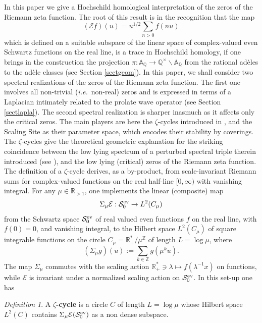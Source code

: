 \documentclass{pspum-l}
\theoremstyle{definition}
\theoremstyle{remark}
\numberwithin{equation}{section}
\newtheorem*{definition*}{Definition}
\newcommand{\ie}{{\it i.e.\/}\ }
\def\A{{\mathbb A}}
\def\Q{{\mathbb Q}}
\def\R{{\mathbb R}}
\def\Z{{\mathbb Z}}
\def\cE{{\mathcal E}}
\def\cS{{\mathcal S}}
\def\sr0{{\cS^{\rm ev}_0}}
\begin{document}
In this paper we give a Hochschild  homological interpretation of  the  zeros of the Riemann zeta function.  The root of this result is in the recognition that the map 
\[
(\cE f)(u)=u^{1/2}\sum_{n>0} f(nu)
\]
which is defined on a suitable subspace  of the linear space of complex-valued even Schwartz functions  on the real line, is a trace  in Hochschild homology, if one brings in the construction the projection $\pi:\A_\Q\to \Q^\times\backslash \A_\Q$ from the rational ad\`eles to the ad\`ele classes (see Section \ref{sectgeom}). In this paper, we shall  consider two spectral realizations of the zeros of the Riemann zeta function. The first one involves all non-trivial (\ie non-real) zeros and  is expressed in terms of a Laplacian intimately related to the prolate wave operator (see Section \ref{sectlapla}). The  second spectral realization is sharper inasmuch as it affects only the critical zeros. The main players   are here the $\zeta$-cycles introduced in \cite{ccspectral}, and  the Scaling Site \cite{CCscal1} as their parameter space, which encodes their stability  by coverings. 
 The $\zeta$-cycles give the theoretical geometric explanation for the striking  coincidence between the low lying spectrum of a perturbed spectral triple therein introduced (see \cite{ccspectral}), and the low lying (critical) zeros
of the Riemann zeta function. The definition of a $\zeta$-cycle  derives, as a by-product,  from  scale-invariant Riemann sums  for complex-valued functions  on the real half-line $[0,\infty)$  with vanishing integral. For any $\mu\in\R_{>1}$, one implements the  linear (composite) map 
\[
\Sigma_\mu \cE: \sr0\to L^2(C_\mu)
\]
from  the Schwartz space $\sr0$ of real valued even functions  $f$ on the real line, with $f(0)=0$, and vanishing  integral, to the Hilbert space $L^2(C_\mu)$ of square integrable functions on the circle $C_\mu=\R_+^*/\mu^\Z$  of length $L=\log \mu$, where 
\[
(\Sigma_\mu g)(u):=\sum_{k\in\Z} g(\mu^ku).
\]
 The map $\Sigma_\mu$ commutes with the scaling action $\R^*_+\ni \lambda\mapsto f(\lambda^{-1}x)$  on functions, while $\cE$ is invariant under a normalized scaling action on $\sr0$.  In this set-up  one  has
 \begin{definition*} A {\bf $\zeta$-cycle} is  a circle $C$ of length $L=\log \mu$  whose Hilbert space $L^2(C)$ contains  $\Sigma_\mu \cE(\sr0)$ as a non dense subspace.
\end{definition*}
 
\end{document}
